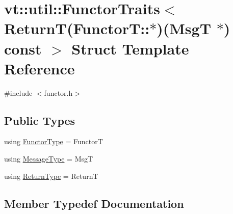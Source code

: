 \hypertarget{structvt_1_1util_1_1_functor_traits_3_01_return_t_07_functor_t_1_1_5_08_07_msg_t_01_5_08_01const_01_4}{}\section{vt\+:\+:util\+:\+:Functor\+Traits$<$ ReturnT(FunctorT\+:\+:$\ast$)(MsgT $\ast$) const $>$ Struct Template Reference}
\label{structvt_1_1util_1_1_functor_traits_3_01_return_t_07_functor_t_1_1_5_08_07_msg_t_01_5_08_01const_01_4}


{\ttfamily \#include $<$functor.\+h$>$}

\subsection*{Public Types}
\begin{DoxyCompactItemize}
\item 
using \hyperlink{structvt_1_1util_1_1_functor_traits_3_01_return_t_07_functor_t_1_1_5_08_07_msg_t_01_5_08_01const_01_4_a3cab1564c88c8bab564db22e6c27353e}{Functor\+Type} = FunctorT
\item 
using \hyperlink{structvt_1_1util_1_1_functor_traits_3_01_return_t_07_functor_t_1_1_5_08_07_msg_t_01_5_08_01const_01_4_a902cf5fe43f4d051f1df2969c109b892}{Message\+Type} = MsgT
\item 
using \hyperlink{structvt_1_1util_1_1_functor_traits_3_01_return_t_07_functor_t_1_1_5_08_07_msg_t_01_5_08_01const_01_4_ab9fead7f413753fc7e31305ff320d909}{Return\+Type} = ReturnT
\end{DoxyCompactItemize}


\subsection{Member Typedef Documentation}
\mbox{\label{structvt_1_1util_1_1_functor_traits_3_01_return_t_07_functor_t_1_1_5_08_07_msg_t_01_5_08_01const_01_4_a3cab1564c88c8bab564db22e6c27353e}} 
